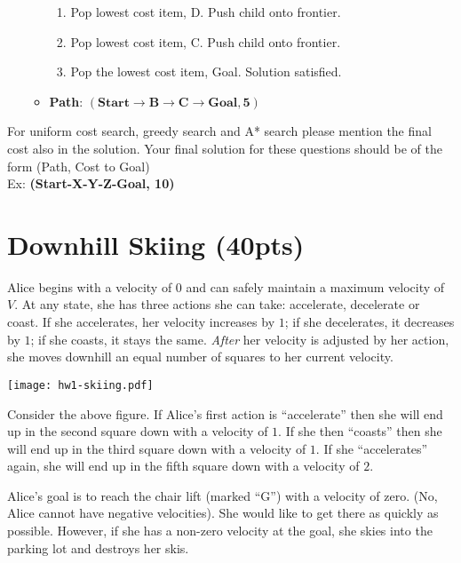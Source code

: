 \documentclass[fleqn]{hermans-hw}
\begin{document}
\begin{enumerate}
\begin{itemize}
\begin{enumerate}
		\item Pop lowest cost item, D. Push child onto frontier. \newline
		[Goal(f=6,tg=6) , C(f=5,tg=4) , Goal(f=6,tg=6) , Goal(f=8,tg=8)]
		
		\item Pop lowest cost item, C. Push child onto frontier.\newline
		[Goal(f=6,tg=6) , Goal(f=6,tg=6) , Goal(f=8,tg=8) , Goal(f=5,tg=5)]
		
		\item Pop the lowest cost item, Goal. Solution satisfied.
		
	\end{enumerate}
	\item \textbf{Path}: $\mathbf{(Start \rightarrow B \rightarrow C \rightarrow Goal, 5)}$
\end{itemize}

\end{enumerate}

For uniform cost search, greedy search and A* search please mention the final cost also in the solution. Your final solution for these questions should be of the form (Path, Cost to Goal)\\
Ex: \textbf{(Start-X-Y-Z-Goal, 10)}


\newpage
\section{Downhill Skiing (40pts)}

Alice begins with a velocity of $0$ and can safely maintain a maximum velocity of $V$.  At any state, she has three actions she can take: accelerate, decelerate or coast.  If she accelerates, her velocity increases by $1$; if she decelerates, it decreases by $1$; if she coasts, it stays the same.  \emph{After} her velocity is adjusted by her action, she moves downhill an equal number of squares to her current velocity.

\texttt{[image: hw1-skiing.pdf]}

Consider the above figure.  If Alice's first action is ``accelerate''
then she will end up in the second square down with a velocity of
$1$.  If she then ``coasts'' then she will end up in the third square
down with a velocity of $1$.  If she ``accelerates'' again, she will
end up in the fifth square down with a velocity of $2$.

Alice's goal is to reach the chair lift (marked ``G'') with a velocity of zero.  (No, Alice cannot have negative velocities).  She would like to get there as quickly as possible.  However, if she has a non-zero velocity at the goal, she skies into the parking lot and destroys her skis.
\end{document}
